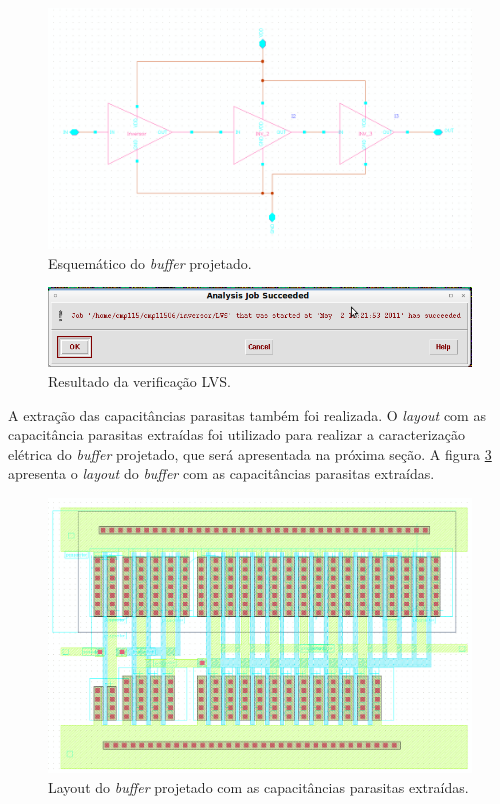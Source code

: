 \documentclass[a4paper,10pt] {article}
\begin{document}
\begin{figure} [h]
	\centering
	\includegraphics[scale=0.3]{esquematico_buffer.png}
	\caption{Esquemático do \textit{buffer} projetado.}
	\label{fig:esquematico}
\end{figure}

\begin{figure} [h]
	\centering
	\includegraphics[scale=0.6]{LVS_buffer.png}
	\caption{Resultado da verificação LVS.}
	\label{fig:lvs}
\end{figure}

A extração das capacitâncias parasitas também foi realizada. O \textit{layout} com as capacitância parasitas extraídas foi utilizado para realizar a caracterização elétrica do \textit{buffer} projetado, que será apresentada na próxima seção. A figura \ref{fig:extraido} apresenta o \textit{layout} do \textit{buffer} com as capacitâncias parasitas extraídas.

\begin{figure} [h]
	\centering
	\includegraphics[scale=0.2]{extraido_buffer.png}
	\caption{Layout do \textit{buffer} projetado com as capacitâncias parasitas extraídas.}
	\label{fig:extraido}
\end{figure}
\end{document}
